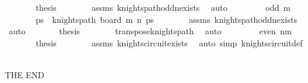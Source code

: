 \begin{isabellebody}
\ \ \ \ \isamarkupfalse%
\ \isamarkupfalse%
\ {\isacharquery}{\kern0pt}thesis\isanewline
\ \ \ \ \ \ \isamarkupfalse%
\ assms\ knights{\isacharunderscore}{\kern0pt}path{\isacharunderscore}{\kern0pt}odd{\isacharunderscore}{\kern0pt}n{\isacharunderscore}{\kern0pt}exists\ \isamarkupfalse%
\ auto\isanewline
\ \ \isamarkupfalse%
\isanewline
\ \ \ \ \isamarkupfalse%
\ {\isachardoublequoteopen}odd\ m{\isachardoublequoteclose}\isanewline
\ \ \ \ \isamarkupfalse%
\ \isamarkupfalse%
\ ps\ \ {\isachardoublequoteopen}knights{\isacharunderscore}{\kern0pt}path\ {\isacharparenleft}{\kern0pt}board\ m\ n{\isacharparenright}{\kern0pt}\ ps{\isachardoublequoteclose}\isanewline
\ \ \ \ \ \ \isamarkupfalse%
\ assms\ knights{\isacharunderscore}{\kern0pt}path{\isacharunderscore}{\kern0pt}odd{\isacharunderscore}{\kern0pt}n{\isacharunderscore}{\kern0pt}exists\ \isamarkupfalse%
\ auto\isanewline
\ \ \ \ \isamarkupfalse%
\ \isamarkupfalse%
\ {\isacharquery}{\kern0pt}thesis\isanewline
\ \ \ \ \ \ \isamarkupfalse%
\ transpose{\isacharunderscore}{\kern0pt}knights{\isacharunderscore}{\kern0pt}path\ \isamarkupfalse%
\ auto\isanewline
\ \ \isamarkupfalse%
\isanewline
\ \ \ \ \isamarkupfalse%
\ {\isachardoublequoteopen}even\ {\isacharparenleft}{\kern0pt}n{\isacharasterisk}{\kern0pt}m{\isacharparenright}{\kern0pt}{\isachardoublequoteclose}\isanewline
\ \ \ \ \isamarkupfalse%
\ \isamarkupfalse%
\ {\isacharquery}{\kern0pt}thesis\isanewline
\ \ \ \ \ \ \isamarkupfalse%
\ assms\ knights{\isacharunderscore}{\kern0pt}circuit{\isacharunderscore}{\kern0pt}exists\ \isamarkupfalse%
\ {\isacharparenleft}{\kern0pt}auto\ simp{\isacharcolon}{\kern0pt}\ knights{\isacharunderscore}{\kern0pt}circuit{\isacharunderscore}{\kern0pt}def{\isacharparenright}{\kern0pt}\isanewline
\ \ \isamarkupfalse%
\isanewline
{}\isamarkupfalse%
%
\endisatagproof
{\isafoldproof}%
%
\isadelimproof
%
\endisadelimproof
%
\begin{isamarkuptext}%
THE END%
\end{isamarkuptext}\isamarkuptrue%
%
\isadelimtheory
%
\endisadelimtheory
%
\isatagtheory
{}\isamarkupfalse%
%
\endisatagtheory
{\isafoldtheory}%
%
\isadelimtheory
%
\endisadelimtheory
%
\end{isabellebody}%
